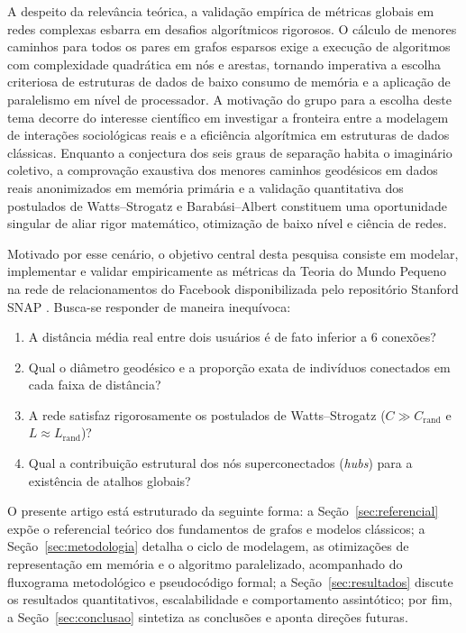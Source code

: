 \documentclass[conference]{IEEEtran}
\begin{document}
A despeito da relevância teórica, a validação empírica de métricas globais em redes complexas esbarra em desafios algorítmicos rigorosos. O cálculo de menores caminhos para todos os pares em grafos esparsos exige a execução de algoritmos com complexidade quadrática em nós e arestas, tornando imperativa a escolha criteriosa de estruturas de dados de baixo consumo de memória e a aplicação de paralelismo em nível de processador. A motivação do grupo para a escolha deste tema decorre do interesse científico em investigar a fronteira entre a modelagem de interações sociológicas reais e a eficiência algorítmica em estruturas de dados clássicas. Enquanto a conjectura dos seis graus de separação habita o imaginário coletivo, a comprovação exaustiva dos menores caminhos geodésicos em dados reais anonimizados em memória primária e a validação quantitativa dos postulados de Watts--Strogatz e Barabási--Albert constituem uma oportunidade singular de aliar rigor matemático, otimização de baixo nível e ciência de redes.

Motivado por esse cenário, o objetivo central desta pesquisa consiste em modelar, implementar e validar empiricamente as métricas da Teoria do Mundo Pequeno na rede de relacionamentos do Facebook disponibilizada pelo repositório Stanford SNAP \cite{snapfacebook,mcauley2012learning}. Busca-se responder de maneira inequívoca:
\begin{enumerate}
    \item A distância média real entre dois usuários é de fato inferior a 6 conexões?
    \item Qual o diâmetro geodésico e a proporção exata de indivíduos conectados em cada faixa de distância?
    \item A rede satisfaz rigorosamente os postulados de Watts--Strogatz ($C \gg C_{\text{rand}}$ e $L \approx L_{\text{rand}}$)?
    \item Qual a contribuição estrutural dos nós superconectados (\textit{hubs}) para a existência de atalhos globais?
\end{enumerate}

O presente artigo está estruturado da seguinte forma: a Seção~\ref{sec:referencial} expõe o referencial teórico dos fundamentos de grafos e modelos clássicos; a Seção~\ref{sec:metodologia} detalha o ciclo de modelagem, as otimizações de representação em memória e o algoritmo paralelizado, acompanhado do fluxograma metodológico e pseudocódigo formal; a Seção~\ref{sec:resultados} discute os resultados quantitativos, escalabilidade e comportamento assintótico; por fim, a Seção~\ref{sec:conclusao} sintetiza as conclusões e aponta direções futuras.
\end{document}
